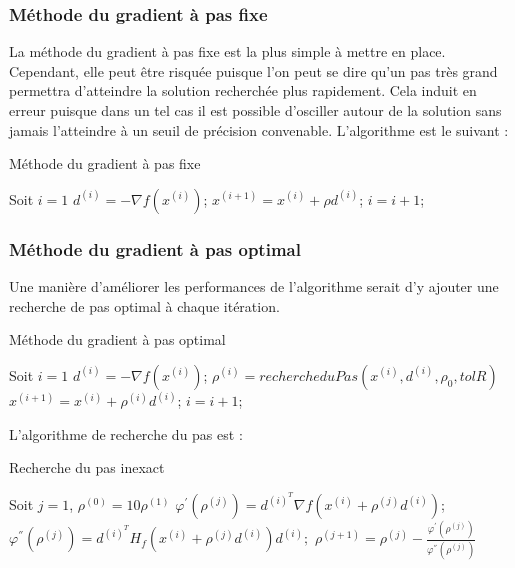 \subsubsection{Méthode du gradient à pas fixe}
La méthode du gradient à pas fixe est la plus simple à mettre en place. Cependant, elle peut être risquée puisque l'on peut se dire qu'un pas très grand permettra d'atteindre la solution recherchée plus rapidement. Cela induit en erreur puisque dans un tel cas il est possible d'osciller autour de la solution sans jamais l'atteindre à un seuil de précision convenable. L'algorithme est le suivant :
\begin{algorithm}
	\caption{Méthode du gradient à pas fixe}
	\begin{algorithmic}[1]
		\State Soit $i=1$
		\State $d^{(i)}=-\nabla f(x^{(i)})$;
		\State $x^{(i+1)}=x^{(i)}+\rho d^{(i)}$;
		\State $i = i+1$;
		\EndWhile
		\EndProcedure
	\end{algorithmic}
\end{algorithm}
\subsubsection{Méthode du gradient à pas optimal}
Une manière d'améliorer les performances de l'algorithme serait d'y ajouter une recherche de pas optimal à chaque itération.
\begin{algorithm}[H]
	\caption{Méthode du gradient à pas  optimal}
	\begin{algorithmic}[1]
		\State Soit $i=1$
		\State $d^{(i)}=-\nabla f(x^{(i)})$;
		\State $\rho^{(i)}=rechercheduPas(x^{(i)},d^{(i)},\rho_0,tolR)$
		\State $x^{(i+1)}=x^{(i)}+\rho^{(i)} d^{(i)}$;
		\State $i = i+1$;
		\EndWhile
		\EndProcedure
	\end{algorithmic}
\end{algorithm}
L'algorithme de recherche du pas est :
\begin{algorithm}[H]
	\caption{Recherche du pas inexact}
	\begin{algorithmic}[1]
		\State Soit $j=1$, $\rho^{(0)}=10\rho^{(1)}$
		\State $\varphi^{'}(\rho^{(j)})=d^{(i)^T}\nabla f(x^{(i)}+\rho^{(j)}d^{(i)})$;
		\State $\varphi^{''}(\rho^{(j)})=d^{(i)^T} H_f(x^{(i)}+\rho^{(j)}d^{(i)})d^{(i)};$
		\State $\rho^{(j+1)}=\rho^{(j)}-\frac{\varphi^{'}(\rho^{(j)})}{\varphi^{''}(\rho^{(j)})}$
		\EndWhile
		\EndProcedure
		\end{algorithmic}
	\end{algorithm}
